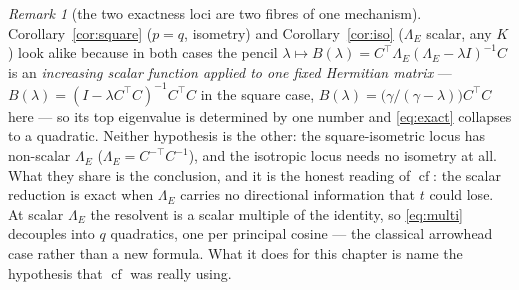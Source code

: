 \documentclass[11pt]{article}
\theoremstyle{remark}
\newtheorem{remark}{Remark}[section]
\newcommand{\Le}{\Lambda_E}
\begin{document}
\begin{remark}[the two exactness loci are two fibres of one mechanism]\label{rem:loci}
Corollary~\ref{cor:square} ($p=q$, isometry) and Corollary~\ref{cor:iso} ($\Le$ scalar, any $K$) look
alike because in both cases the pencil $\lambda\mapsto B(\lambda)=C^{\top}\Le(\Le-\lambda I)^{-1}C$ is
an \emph{increasing scalar function applied to one fixed Hermitian matrix} ---
$B(\lambda)=(I-\lambda C^{\top}C)^{-1}C^{\top}C$ in the square case, $B(\lambda)=\bigl(\gamma/(\gamma-\lambda)\bigr)C^{\top}C$
here --- so its top eigenvalue is determined by one number and \eqref{eq:exact} collapses to a
quadratic. Neither hypothesis is the other: the square-isometric locus has non-scalar $\Le$
($\Le=C^{-\top}C^{-1}$), and the isotropic locus needs no isometry at all. What they share is the
conclusion, and it is the honest reading of $\operatorname{cf}$: the scalar reduction is exact when
$\Le$ carries no directional information that $t$ could lose. At scalar $\Le$ the resolvent is a
scalar multiple of the identity, so \eqref{eq:multi} decouples into $q$ quadratics, one per principal
cosine --- the classical arrowhead case rather than a new formula. What it does for this chapter is
name the hypothesis that $\operatorname{cf}$ was really using.
\end{remark}
\end{document}
